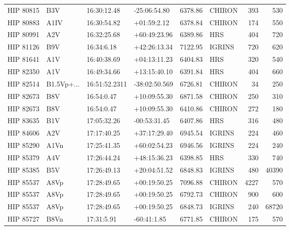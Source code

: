 \documentclass{emulateapj}
\begin{document}
\begin{longtable*}{|l|lllrlrr|}
   HIP 80815 &            B3V &    16:30:12.48 &   -25:06:54.80 &  6378.86 &     CHIRON &      393 &     530 \\
   HIP 80883 &           A1IV &    16:30:54.82 &    +01:59:2.12 &  6378.84 &     CHIRON &      174 &     550 \\
   HIP 80991 &            A2V &    16:32:25.68 &   +60:49:23.96 &  6389.86 &        HRS &      404 &     720 \\
   HIP 81126 &            B9V &     16:34:6.18 &   +42:26:13.34 &  7122.95 &     IGRINS &      720 &     620 \\
   HIP 81641 &            A1V &    16:40:38.69 &   +04:13:11.23 &  6404.83 &        HRS &      320 &     540 \\
   HIP 82350 &            A1V &    16:49:34.66 &   +13:15:40.10 &  6391.84 &        HRS &      404 &     660 \\
   HIP 82514 &     B1.5Vp+... &  16:51:52.2311 &  -38:02:50.569 &  6726.81 &     CHIRON &       34 &     250 \\
   HIP 82673 &            B8V &     16:54:0.47 &   +10:09:55.30 &  6871.58 &     CHIRON &      250 &     310 \\
   HIP 82673 &            B8V &     16:54:0.47 &   +10:09:55.30 &  6410.86 &     CHIRON &      272 &     180 \\
   HIP 83635 &            B1V &    17:05:32.26 &   -00:53:31.45 &  6407.86 &        HRS &      316 &     480 \\
   HIP 84606 &            A2V &    17:17:40.25 &   +37:17:29.40 &  6945.54 &     IGRINS &      224 &     460 \\
   HIP 85290 &           A1Vn &    17:25:41.35 &   +60:02:54.23 &  6946.56 &     IGRINS &      224 &     240 \\
   HIP 85379 &            A4V &    17:26:44.24 &   +48:15:36.23 &  6398.85 &        HRS &      330 &     740 \\
   HIP 85385 &            B5V &    17:26:49.13 &   +20:04:51.52 &  6848.83 &     IGRINS &      480 &   40390 \\
   HIP 85537 &           A8Vp &    17:28:49.65 &   +00:19:50.25 &  7096.88 &     CHIRON &     4227 &     570 \\
   HIP 85537 &           A8Vp &    17:28:49.65 &   +00:19:50.25 &  6792.73 &     CHIRON &      900 &     600 \\
   HIP 85537 &           A8Vp &    17:28:49.65 &   +00:19:50.25 &  6848.73 &     IGRINS &      240 &   68720 \\
   HIP 85727 &           B8Vn &     17:31:5.91 &    -60:41:1.85 &  6771.85 &     CHIRON &      175 &     570 \\

\end{longtable*}
\end{document}
